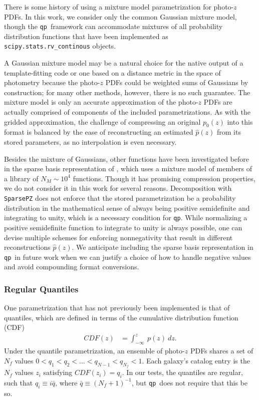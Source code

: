 \documentclass[\docopts]{\docclass}
\newcommand{\qp}{\texttt{qp}}
\newcommand{\pz}{photo-$z$ PDF}
\begin{document}
There is some history of using a mixture model parametrization for \pz s.  
  In this work, we consider only the common Gaussian 
mixture model, though the \qp\ framework can accommodate mixtures of all 
probability distribution functions that have been implemented as 
\texttt{scipy.stats.rv\_continous} objects.

A Gaussian mixture model may be a natural choice for the native output of a 
template-fitting code or one based on a distance metric in the space of 
photometry because the \pz s could be weighted sums of Gaussians by 
construction; for many other methods, however, there is no such guarantee.  The 
mixture model is only an accurate approximation of the \pz s are actually 
comprised of components of the included parametrizations.  As with the gridded 
approximation, the challenge of compressing an original $p_{0}(z)$ into this 
format is balanced by the ease of reconstructing an estimated $\hat{p}(z)$ from 
its stored parameters, as no interpolation is even necessary.

Besides the mixture of Gaussians, other functions have been investigated before 
in the sparse basis representation of \citet{carrasco_kind_sparse_2014}, which 
uses a mixture model of members of a library of $N_{M}\sim10^{4}$ functions.  
Though it has promising compression properties, we do not consider it in this 
work for several reasons.  Decomposition with \texttt{SparsePZ} does not 
enforce that the stored parametrization be a probability distribution in the 
mathematical sense of always being positive semidefinite and integrating to 
unity, which is a necessary condition for \qp.  While normalizing a positive 
semidefinite function to integrate to unity is always possible, one can devise 
multiple schemes for enforcing nonnegativity that result in different 
reconstructions $\hat{p}(z)$.   We anticipate including the sparse basis 
representation in \qp\ in future work when we can justify a choice of how to 
handle negative values and avoid compounding format conversions.


\subsubsection{Regular Quantiles}
\label{sec:quantiles}

One parametrization that has not previously been implemented is that of 
quantiles, which are defined in terms of the cumulative distribution function 
(CDF)
\begin{align}
  \label{eq:cdf}
  CDF(z) &= \int_{-\infty}^{z}\ p(z)\ dz.
\end{align}
Under the quantile parametrization, an ensemble of \pz s shares a set of 
$N_{f}$ values $0<q_{1}<q_{2}<\dots<q_{N-1}<q_{N_{f}}<1$.  Each galaxy's 
catalog entry is the $N_{f}$ values $z_{i}$ satisfying $CDF(z_{i})=q_{i}$.  In 
our tests, the quantiles are regular, such that $q_{i}\equiv i\bar{q}$, where 
$\bar{q}\equiv(N_{f}+1)^{-1}$, but \qp\ does not require that this be so.
\end{document}
